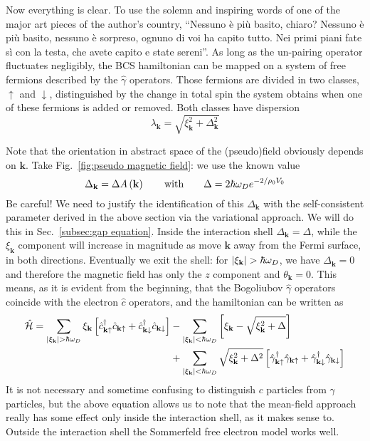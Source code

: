 Now everything is clear. To use the solemn and inspiring words of one of the major art pieces of the author's country, ``Nessuno è più basito, chiaro? Nessuno è più basito, nessuno è sorpreso, ognuno di voi ha capito tutto. Nei primi piani fate sì con la testa, che avete capito e state sereni''. As long as the un-pairing operator fluctuates negligibly, the BCS hamiltonian can be mapped on a system of free fermions described by the $\hat{\gamma}$ operators. Those fermions are divided in two classes, $\uparrow$ and $\downarrow$, distinguished by the change in total spin the system obtains when one of these fermions is added or removed. Both classes have dispersion
\[
	\lambda_\mathbf{k} = \sqrt{\xi_\mathbf{k}^2 + \Delta_\mathbf{k}^2}
\]

Note that the orientation in abstract space of the (pseudo)field obviously depends on $\mathbf{k}$. Take Fig.~\ref{fig:pseudo magnetic field}: we use the known value
\[
	\Delta_\mathbf{k} = \Delta A\lrR{\mathbf{k}}
	\quad\qq{with}\quad
	\Delta = 2 \hbar\omega_D e^{-2/\rho_0 V_0}
\]
Be careful! We need to justify the identification of this $\Delta_\mathbf{k}$ with the self-consistent parameter derived in the above section via the variational approach. We will do this in Sec.~\ref{subsec:gap equation}.
Inside the interaction shell $\Delta_\mathbf{k} = \Delta$, while the $\xi_\mathbf{k}$ component will increase in magnitude as move $\mathbf{k}$ away from the Fermi surface, in both directions. Eventually we exit the shell: for $\abs{\xi_\mathbf{k}} > \hbar\omega_D$, we have $\Delta_\mathbf{k} = 0$ and therefore the magnetic field has only the $z$ component and $\theta_\mathbf{k}=0$.  This means, as it is evident from the beginning, that the Bogoliubov $\hat{\gamma}$ operators coincide with the electron $\hat{c}$ operators, and the hamiltonian can be written as
\[
\begin{aligned}
	\hat{\mathcal{H}} = \sum_{\abs{\xi_\mathbf{k}} > \hbar\omega_D} \xi_\mathbf{k} \left[{ \hat{c}_{\mathbf{k}\uparrow}^\dagger \hat{c}_{\mathbf{k}\uparrow}
	+ \hat{c}_{\mathbf{k}\downarrow}^\dagger \hat{c}_{\mathbf{k}\downarrow}}\right] &- \sum_{\abs{\xi_\mathbf{k}}<\hbar\omega_D} \left[{\xi_\mathbf{k} - \sqrt{\xi_\mathbf{k}^2 + \Delta}}\right] \\ 		
	&+ \sum_{\abs{\xi_\mathbf{k}} < \hbar\omega_D} \sqrt{\xi_\mathbf{k}^2 + \Delta^2} \left[{ \hat{\gamma}_{\mathbf{k}\uparrow}^\dagger \hat{\gamma}_{\mathbf{k}\uparrow} + \hat{\gamma}_{\mathbf{k}\downarrow}^\dagger \hat{\gamma}_{\mathbf{k}\downarrow}}\right]
\end{aligned}
\]
It is not necessary and sometime confusing to distinguish $c$ particles from $\gamma$ particles, but the above equation allows us to note that the mean-field approach really has some effect only inside the interaction shell, as it makes sense to. Outside the interaction shell the Sommerfeld free electron model works well.

